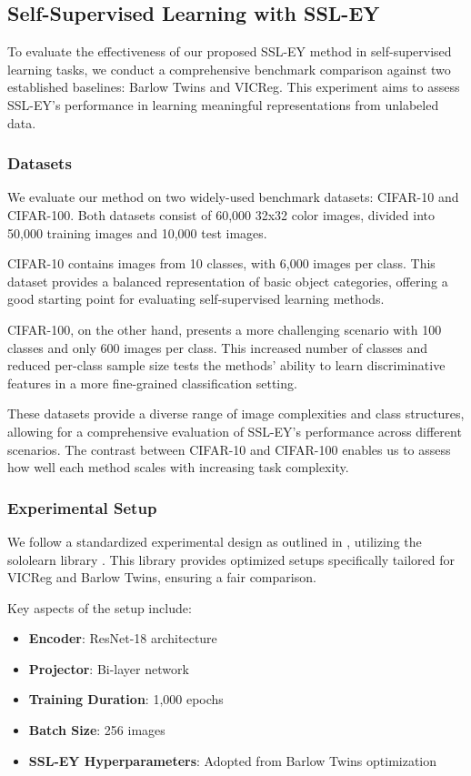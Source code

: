 \subsection{Self-Supervised Learning with SSL-EY}

To evaluate the effectiveness of our proposed SSL-EY method in self-supervised learning tasks, we conduct a comprehensive benchmark comparison against two established baselines: Barlow Twins and VICReg. This experiment aims to assess SSL-EY's performance in learning meaningful representations from unlabeled data.

\subsubsection{Datasets}

We evaluate our method on two widely-used benchmark datasets: CIFAR-10 and CIFAR-100. Both datasets consist of 60,000 32x32 color images, divided into 50,000 training images and 10,000 test images.

CIFAR-10 contains images from 10 classes, with 6,000 images per class. This dataset provides a balanced representation of basic object categories, offering a good starting point for evaluating self-supervised learning methods.

CIFAR-100, on the other hand, presents a more challenging scenario with 100 classes and only 600 images per class. This increased number of classes and reduced per-class sample size tests the methods' ability to learn discriminative features in a more fine-grained classification setting.

These datasets provide a diverse range of image complexities and class structures, allowing for a comprehensive evaluation of SSL-EY's performance across different scenarios. The contrast between CIFAR-10 and CIFAR-100 enables us to assess how well each method scales with increasing task complexity.

\subsubsection{Experimental Setup}
We follow a standardized experimental design as outlined in \citet{tong2023emp}, utilizing the sololearn library \citep{da2022solo}. This library provides optimized setups specifically tailored for VICReg and Barlow Twins, ensuring a fair comparison.

Key aspects of the setup include:
\begin{itemize}
    \item \textbf{Encoder}: ResNet-18 architecture
    \item \textbf{Projector}: Bi-layer network
    \item \textbf{Training Duration}: 1,000 epochs
    \item \textbf{Batch Size}: 256 images
    \item \textbf{SSL-EY Hyperparameters}: Adopted from Barlow Twins optimization
\end{itemize}


